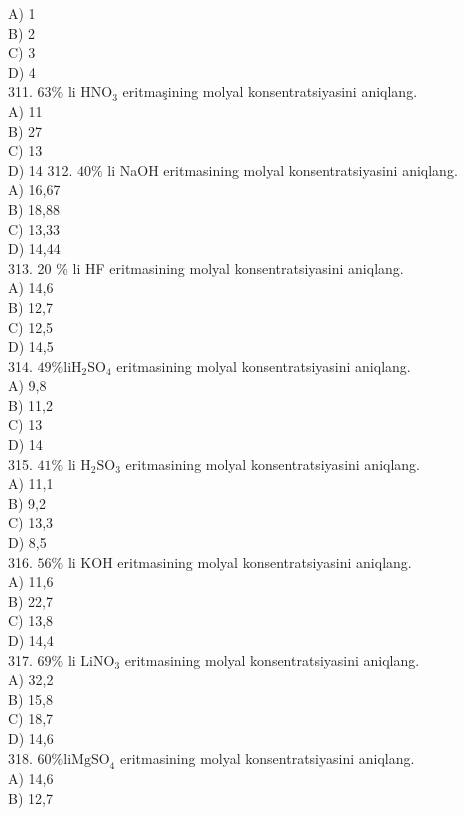 A) 1\\
B) 2\\
C) 3\\
D) 4\\
311. $63 \%$ li $\mathrm{HNO}_{3}$ eritmaşining molyal konsentratsiyasini aniqlang.\\
A) 11\\
B) 27\\
C) 13\\
D) 14
312. $40 \%$ li NaOH eritmasining molyal konsentratsiyasini aniqlang.\\
A) 16,67\\
B) 18,88\\
C) 13,33\\
D) 14,44\\
313. 20 \% li HF eritmasining molyal konsentratsiyasini aniqlang.\\
A) 14,6\\
B) 12,7\\
C) 12,5\\
D) 14,5\\
314. $49 \% \mathrm{li} \mathrm{H}_{2} \mathrm{SO}_{4}$ eritmasining molyal konsentratsiyasini aniqlang.\\
A) 9,8\\
B) 11,2\\
C) 13\\
D) 14\\
315. $41 \%$ li $\mathrm{H}_{2} \mathrm{SO}_{3}$ eritmasining molyal konsentratsiyasini aniqlang.\\
A) 11,1\\
B) 9,2\\
C) 13,3\\
D) 8,5\\
316. $56 \%$ li KOH eritmasining molyal konsentratsiyasini aniqlang.\\
A) 11,6\\
B) 22,7\\
C) 13,8\\
D) 14,4\\
317. $69 \%$ li $\mathrm{LiNO}_{3}$ eritmasining molyal konsentratsiyasini aniqlang.\\
A) 32,2\\
B) 15,8\\
C) 18,7\\
D) 14,6\\
318. $60 \% \mathrm{li} \mathrm{MgSO}_{4}$ eritmasining molyal konsentratsiyasini aniqlang.\\
A) 14,6\\
B) 12,7\\
